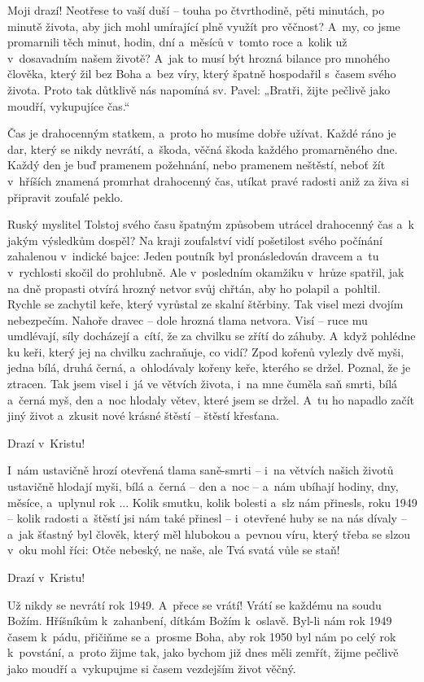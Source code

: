 {{Moji drazí! Neotřese to vaší duší -- touha po čtvrthodině, pěti
minutách, po minutě života, aby jich mohl umírající plně využít pro věčnost?
A~my, co jsme promarnili těch minut, hodin, dní a~měsíců v~tomto roce
a~kolik už v~dosavadním našem životě? A~jak to musí být hrozná bilance pro
mnohého člověka, který žil bez Boha a~bez víry, který špatně hospodařil
s~časem svého života. Proto tak důtklivě nás napomíná sv. Pavel: „Bratři,
žijte pečlivě jako moudří, vykupujíce čas.“ 

Čas je drahocenným statkem, a~proto ho musíme dobře užívat. Každé
ráno je dar, který se nikdy nevrátí, a~škoda, věčná škoda každého
promarněného dne. Každý den je buď pramenem požehnání, nebo pramenem
neštěstí, neboť žít v~hříších znamená promrhat drahocenný čas, utíkat pravé
radosti aniž za živa si připravit zoufalé peklo. 

Ruský myslitel Tolstoj svého času špatným způsobem utrácel
drahocenný čas a~k jakým výsledkům dospěl? Na kraji zoufalství vidí
pošetilost svého počínání zahalenou v~indické bajce: Jeden poutník byl
pronásledován dravcem a~tu v~rychlosti skočil do prohlubně. Ale v~posledním
okamžiku v~hrůze spatřil, jak na dně propasti otvírá hrozný netvor svůj
chřtán, aby ho polapil a~pohltil. Rychle se zachytil keře, který vyrůstal ze
skalní štěrbiny. Tak visel mezi dvojím nebezpečím. Nahoře dravec -- dole
hrozná tlama netvora. Visí -- ruce mu umdlévají, síly docházejí a~cítí, že za
chvilku se zřítí do záhuby. A~když pohlédne ku keři, který jej na chvilku
zachraňuje, co vidí? Zpod kořenů vylezly dvě myši, jedna bílá, druhá černá,
a~ohlodávaly kořeny keře, kterého se držel. Poznal, že je ztracen. Tak jsem
visel i~já ve větvích života, i~na mne čuměla saň smrti, bílá a~černá myš,
den a~noc hlodaly větev, které jsem se držel. A~tu ho napadlo začít jiný
život a~zkusit nové krásné štěstí -- štěstí křesťana. 

Drazí v~Kristu! 

I~nám ustavičně hrozí otevřená tlama saně-smrti -- i~na větvích našich životů
ustavičně hlodají myši, bílá a~černá -- den a~noc -- a~nám ubíhají hodiny,
dny, měsíce, a~uplynul rok ...  Kolik smutku, kolik bolesti a~slz nám
přinesls, roku 1949 -- kolik radosti a~štěstí jsi nám také přinesl
-- i~otevřené huby se na nás dívaly -- a~jak šťastný byl člověk, který měl
hlubokou a~pevnou víru, který třeba se slzou v~oku mohl říci: Otče nebeský,
ne naše, ale Tvá svatá vůle se staň! 

Drazí v~Kristu! 

Už nikdy se nevrátí rok 1949. A~přece se vrátí! Vrátí se každému na soudu
Božím. Hříšníkům k~zahanbení, dítkám Božím k~oslavě. Byl-li nám rok 1949
časem k~pádu, přičiňme se a~prosme Boha, aby rok 1950 byl nám po celý rok
k~povstání, a~proto žijme tak, jako bychom již dnes měli zemřít, žijme pečlivě
jako moudří a~vykupujme si časem vezdejším život věčný. 

}}
